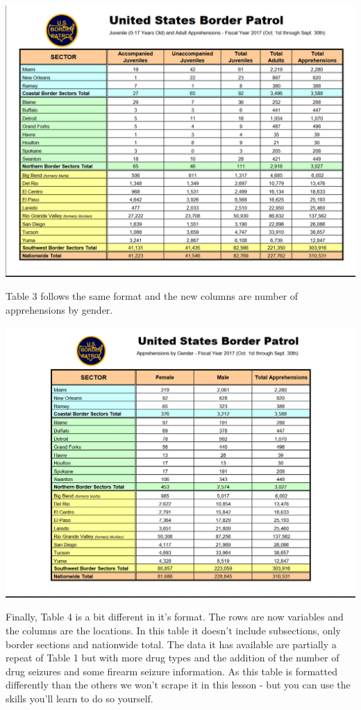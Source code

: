 \documentclass[
  12pt,
]{book}
\begin{document}
\includegraphics{images/pdf_table_2.PNG}

Table 3 follows the same format and the new columns are number of apprehensions by gender.

\includegraphics{images/pdf_table_3.PNG}

Finally, Table 4 is a bit different in it's format. The rows are now variables and the columns are the locations. In this table it doesn't include subsections, only border sections and nationwide total. The data it has available are partially a repeat of Table 1 but with more drug types and the addition of the number of drug seizures and some firearm seizure information. As this table is formatted differently than the others we won't scrape it in this lesson - but you can use the skills you'll learn to do so yourself.
\end{document}
